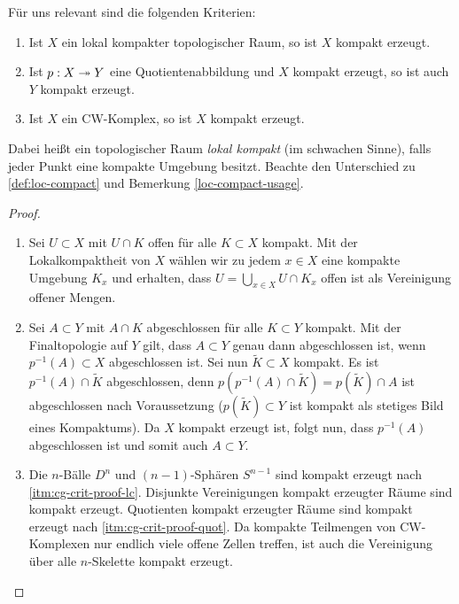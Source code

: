 Für uns relevant sind die folgenden Kriterien:
\begin{lemma} \label{cg-crit}
  \begin{enumerate}[label=(\roman*)]
    \item \label{itm:cg-crit-lc} Ist $X$ ein lokal kompakter
      topologischer Raum, so ist $X$ kompakt erzeugt.
    \item \label{itm:cg-crit-quot} Ist $p: X \twoheadrightarrow Y$ eine
      Quotientenabbildung und $X$ kompakt erzeugt, so ist auch $Y$
      kompakt erzeugt.
     \item \label{itm:cg-crit-cw} Ist $X$ ein CW-Komplex, so ist $X$
       kompakt erzeugt.
  \end{enumerate}
\end{lemma}
Dabei heißt ein topologischer Raum \emph{lokal kompakt} (im schwachen
Sinne), falls jeder Punkt eine kompakte Umgebung besitzt. Beachte den
Unterschied zu \ref{def:loc-compact} und Bemerkung
\ref{loc-compact-usage}.
\begin{proof}
  \begin{enumerate}[label=(\roman*)]
    \item \label{itm:cg-crit-proof-lc} Sei $U \subset X$ mit $U \cap
      K$ offen für alle $K \subset X$ kompakt. Mit der
      Lokalkompaktheit von $X$ wählen wir zu jedem $x \in X$ eine
      kompakte Umgebung $K_x$ und erhalten, dass $U = \bigcup_{x \in
        X} U \cap K_x$ offen ist als Vereinigung offener Mengen.
    \item \label{itm:cg-crit-proof-quot} Sei $A \subset Y$ mit $A \cap
      K$ abgeschlossen für alle $K \subset Y$ kompakt. Mit der
      Finaltopologie auf $Y$ gilt, dass $A \subset Y$ genau dann
      abgeschlossen ist, wenn $p^{-1}(A) \subset X$ abgeschlossen
      ist. Sei nun $\tilde{K} \subset X$ kompakt. Es ist $p^{-1}(A)
      \cap \tilde{K}$ abgeschlossen, denn $p(p^{-1}(A) \cap \tilde{K})
      = p(\tilde{K}) \cap A$ ist abgeschlossen nach Voraussetzung
      ($p(\tilde{K}) \subset Y$ ist kompakt als stetiges Bild eines
      Kompaktums). Da $X$ kompakt erzeugt ist, folgt nun, dass
      $p^{-1}(A)$ abgeschlossen ist und somit auch $A \subset Y$.
    \item Die $n$-Bälle $D^n$ und $(n-1)$-Sphären $S^{n-1}$ sind
      kompakt erzeugt nach \ref{itm:cg-crit-proof-lc}. Disjunkte
      Vereinigungen kompakt erzeugter Räume sind kompakt
      erzeugt. Quotienten kompakt erzeugter Räume sind kompakt erzeugt
      nach \ref{itm:cg-crit-proof-quot}. Da kompakte Teilmengen von
      CW-Komplexen nur endlich viele offene Zellen treffen, ist auch
      die Vereinigung über alle $n$-Skelette kompakt erzeugt.
  \end{enumerate}
\end{proof}

